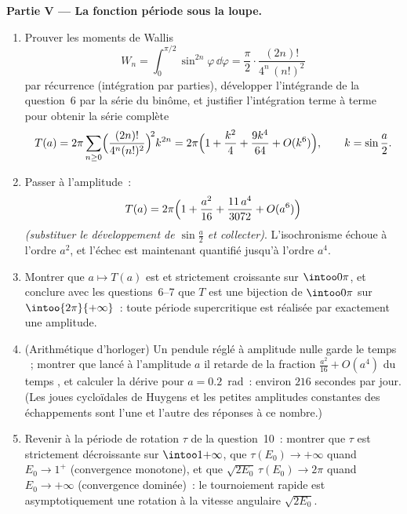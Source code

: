 \begin{problem}
\medskip
\noindent\textbf{Partie V --- La fonction période sous la
loupe.}
\begin{enumerate}[resume]
  \item Prouver les moments de Wallis
        \[
        W_n = \int_0^{\pi/2}\sin^{2n}\varphi\,\dd\varphi
        = \frac\pi2\cdot\frac{(2n)!}{4^n\,(n!)^2}
        \]
        par récurrence (intégration par parties), développer
        l'intégrande de la question~6 par la série du binôme,
        et justifier l'intégration terme à terme pour
        obtenir la série complète
        \[
        T(a) = 2\pi\sum_{n\geq0}
        \Bigl(\frac{(2n)!}{4^n(n!)^2}\Bigr)^{\!2}k^{2n}
        = 2\pi\Bigl(1 + \frac{k^2}4 + \frac{9k^4}{64}
        + O(k^6)\Bigr),
        \qquad k = \sin\frac a2 .
        \]
  \item Passer à l'amplitude~:
        \[
        T(a) = 2\pi\Bigl(1 + \frac{a^2}{16} +
        \frac{11\,a^4}{3072} + O(a^6)\Bigr)
        \]
        \emph{(substituer le développement de $\sin\frac a2$
        et collecter)}. L'isochronisme échoue à l'ordre
        $a^2$, et l'échec est maintenant quantifié jusqu'à
        l'ordre $a^4$.
  \item Montrer que $a \mapsto T(a)$ est  et
        strictement croissante sur $\intoo0\pi$, et conclure
        avec les questions~6--7 que $T$ est une bijection de
        $\intoo0\pi$ sur $\intoo{2\pi}{+\infty}$~: toute
        période supercritique est réalisée par exactement une
        amplitude.
  \item (Arithmétique d'horloger) Un pendule réglé à
        amplitude nulle garde le temps ~; montrer que
        lancé à l'amplitude $a$ il retarde de la fraction
        $\frac{a^2}{16} + O(a^4)$ du temps , et
        calculer la dérive pour $a = 0.2$~rad~: environ $216$
        secondes par jour. (Les joues cycloïdales de Huygens
        et les petites amplitudes constantes des
        échappements sont l'une et l'autre des réponses à ce
        nombre.)
  \item Revenir à la période de rotation $\tau$ de la
        question~10~: montrer que $\tau$ est strictement
        décroissante sur $\intoo1{+\infty}$, que
        $\tau(E_0) \to +\infty$ quand $E_0 \to 1^+$
        (convergence monotone), et que $\sqrt{2E_0}\,\tau(E_0)
        \to 2\pi$ quand $E_0 \to +\infty$ (convergence
        dominée)~: le tournoiement rapide est asymptotiquement
        une rotation  à la vitesse angulaire
        $\sqrt{2E_0}$.
\end{enumerate}


\end{problem}
